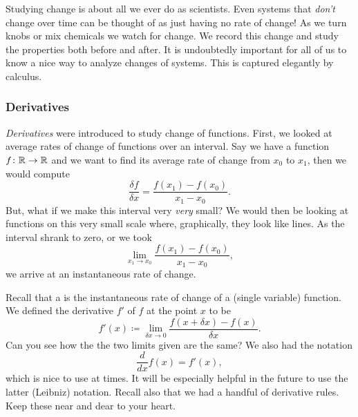     Studying change is about all we ever do as scientists.  Even systems that \emph{don't} change over time can be thought of as just having no rate of change! As we turn knobs or mix chemicals we watch for change. We record this change and study the properties both before and after.  It is undoubtedly important for all of us to know a nice way to analyze changes of systems. This is captured elegantly by calculus.

    \subsubsection{Derivatives}
    \emph{Derivatives} were introduced to study change of functions.  First, we looked at average rates of change of functions over an interval.  Say we have a function $f\colon \mathbb{R} \to \mathbb{R}$ and we want to find its average rate of change from $x_0$ to $x_1$, then we would compute
    \[
    \frac{\delta f}{\delta x} = \frac{f(x_1)-f(x_0)}{x_1-x_0}.
    \]
    But, what if we make this interval very \emph{very} small?  We would then be looking at functions on this very small scale where, graphically, they look like lines. As the interval shrank to zero, or we took
    \[
    \lim_{x_1 \to x_0} \frac{f(x_1)-f(x_0)}{x_1-x_0},
    \]
    we arrive at an instantaneous rate of change.

    Recall that a  is the instantaneous rate of change of a (single variable) function. We defined the derivative $f'$ of $f$ at the point $x$ to be
    \[
    f'(x)\coloneqq\lim_{\delta x \to 0} \frac{f(x+\delta x)-f(x)}{\delta x}.
    \]
    Can you see how the the two limits given are the same? We also had the notation
    \[
    \frac{d}{dx}f(x)=f'(x),
    \]
    which is nice to use at times. It will be especially helpful in the future to use the latter (Leibniz) notation.  Recall also that we had a handful of derivative rules.  Keep these near and dear to your heart.



